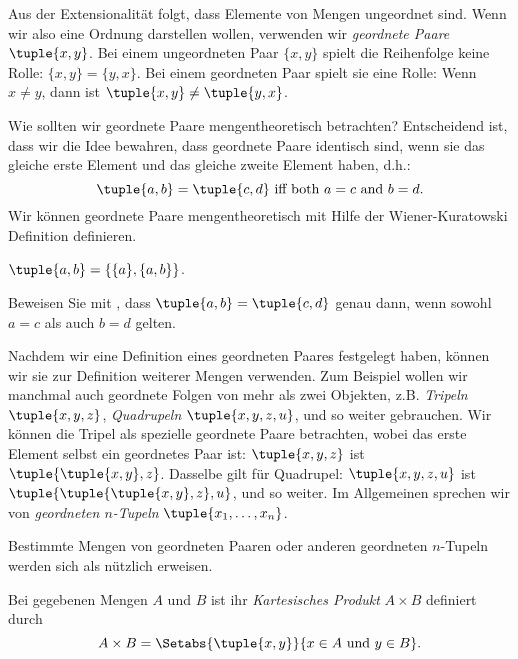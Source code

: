 \documentclass[../../../include/open-logic-section]{subfiles}
\begin{document}

\begin{explain}
Aus der Extensionalität folgt, dass Elemente von Mengen ungeordnet sind.
Wenn wir also eine Ordnung darstellen wollen, verwenden wir \emph{geordnete
Paare} $\tuple{x, y}$. Bei einem ungeordneten Paar $\{x, y\}$ spielt die Reihenfolge
keine Rolle: $\{x, y\} = \{y, x\}$. Bei einem geordneten Paar spielt sie eine Rolle: Wenn $x
\neq y$, dann ist $\tuple{x, y} \neq \tuple{y, x}$.

Wie sollten wir geordnete Paare mengentheoretisch betrachten?
Entscheidend ist, dass wir die Idee bewahren,
dass geordnete Paare identisch sind, wenn sie
das gleiche erste Element und das gleiche zweite Element haben, d.h.:
\[
  \tuple{a, b}= \tuple{c, d}\text{ iff both }a = c \text{ and }b=d.
\]
Wir können geordnete Paare mengentheoretisch mit Hilfe der Wiener-Kuratowski
Definition definieren.
\end{explain}

\begin{defn}
	$\tuple{a, b} = \{\{a\}, \{a, b\}\}$.
\end{defn}

\begin{prob}
	Beweisen Sie mit , dass $\tuple{a,
	b}= \tuple{c, d}$ genau dann, wenn sowohl $a = c$ als auch $b=d$ gelten.
\end{prob}

\begin{explain}
Nachdem wir eine Definition eines geordneten Paares festgelegt haben, 
können wir sie zur Definition
weiterer Mengen verwenden. Zum Beispiel wollen wir manchmal auch geordnete Folgen von
mehr als zwei Objekten, z.B. \emph{Tripeln} $\tuple{x, y, z}$,
\emph{Quadrupeln} $\tuple{x, y, z, u}$, und so weiter gebrauchen.  Wir können die
Tripel als spezielle geordnete Paare betrachten, wobei das erste Element selbst ein
geordnetes Paar ist: $\tuple{x, y, z}$ ist $\tuple{\tuple{x, y},z}$. Dasselbe
gilt für Quadrupel: $\tuple{x,y,z,u}$ ist
$\tuple{\tuple{\tuple{x,y},z},u}$, und so weiter. Im Allgemeinen sprechen wir von
\emph{geordneten $n$-Tupeln} $\tuple{x_1, \dots, x_n}$.

Bestimmte Mengen von geordneten Paaren oder anderen geordneten $n$-Tupeln werden sich als nützlich erweisen.
\end{explain}

\begin{defn}
Bei gegebenen Mengen $A$ und $B$ ist ihr \emph{Kartesisches Produkt} $A \times B$
definiert durch
\[
  A \times B = \Setabs{\tuple{x, y}}{x \in A \text{ und } y \in B}.
\]
\end{defn}
\end{document}
